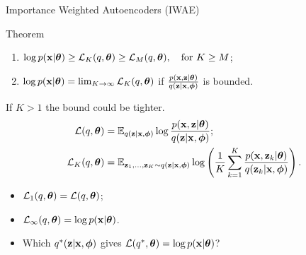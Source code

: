 \documentclass{beamer}
\begin{document}
\begin{frame}{Importance Weighted Autoencoders (IWAE)}
	\begin{block}{Theorem}
		\begin{enumerate}
			\item $\log p(\mathbf{x} | \boldsymbol{\theta}) \geq \mathcal{L}_K (q, \boldsymbol{\theta}) \geq \mathcal{L}_M (q, \boldsymbol{\theta}), \quad \text{for } K \geq M$;
			\item $\log p(\mathbf{x} | \boldsymbol{\theta}) = \lim_{K \rightarrow \infty} \mathcal{L}_K (q, \boldsymbol{\theta})$ if $\frac{p(\mathbf{x}, \mathbf{z} | \boldsymbol{\theta})}{q(\mathbf{z} | \mathbf{x}, \boldsymbol{\phi})}$ is bounded.
		\end{enumerate}
		\vspace{-0.2cm}
	\end{block}
	If $K > 1$ the bound could be tighter.
	\begin{align*}
		\mathcal{L} (q, \boldsymbol{\theta}) &= \mathbb{E}_{q(\mathbf{z} | \mathbf{x}, \boldsymbol{\phi})} \log \frac{p(\mathbf{x}, \mathbf{z} | \boldsymbol{\theta})}{q(\mathbf{z}| \mathbf{x}, \boldsymbol{\phi})}; \\
		\mathcal{L}_K (q, \boldsymbol{\theta}) &= \mathbb{E}_{\mathbf{z}_1, \dots, \mathbf{z}_K \sim q(\mathbf{z} | \mathbf{x}, \boldsymbol{\phi})} \log \left( \frac{1}{K}\sum_{k=1}^K\frac{p(\mathbf{x}, \mathbf{z}_k | \boldsymbol{\theta})}{q(\mathbf{z}_k| \mathbf{x}, \boldsymbol{\phi})} \right).
	\end{align*}
	\vspace{-0.2cm}
	\begin{itemize}
		\item $\mathcal{L}_1(q, \boldsymbol{\theta}) = \mathcal{L}(q, \boldsymbol{\theta})$;
		\item $\mathcal{L}_{\infty}(q, \boldsymbol{\theta}) = \log p(\mathbf{x} | \boldsymbol{\theta})$.
		\item Which $q^*(\mathbf{z} | \mathbf{x}, \boldsymbol{\phi})$ gives $\mathcal{L}(q^*, \boldsymbol{\theta}) = \log p(\mathbf{x} | \boldsymbol{\theta})$? 
	\end{itemize}

\end{frame}
\end{document}
